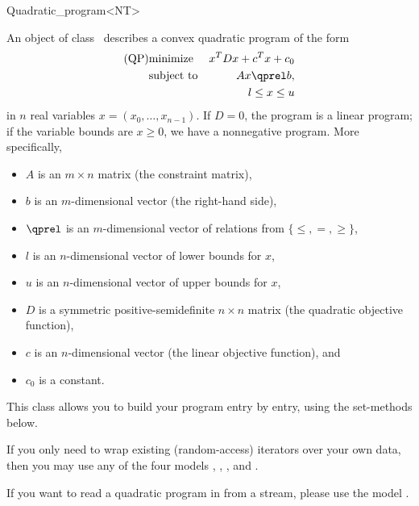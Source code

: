 \begin{ccRefClass}{Quadratic_program<NT>}


\ccDefinition
An object of class \ccRefName\ describes a convex quadratic program of the form
\begin{eqnarray*}
\mbox{(QP)}& \mbox{minimize} & x^{T}Dx+c^{T}x+c_0 \\
&\mbox{subject to}   & Ax\qprel b, \\
&                    & l \leq x \leq u
\end{eqnarray*}
in $n$ real variables $x=(x_0,\ldots,x_{n-1})$. If $D=0$, the program is
a linear program; if the variable bounds are $x\geq 0$, we have a 
nonnegative program. More specifically,  
\begin{itemize}
\item $A$ is an $m\times n$ matrix (the constraint matrix), 
\item $b$ is an $m$-dimensional vector (the right-hand side),
\item $\qprel$ is an $m$-dimensional vector of relations 
from $\{\leq, =, \geq\}$, 
\item $l$ is an $n$-dimensional vector of lower
bounds for $x$,
\item $u$ is an $n$-dimensional vector of upper bounds for
$x$, 
\item $D$ is a symmetric positive-semidefinite $n\times n$ matrix (the
  quadratic objective function),
\item $c$ is an $n$-dimensional vector (the linear objective
  function), and 
\item $c_0$ is a constant.
\end{itemize}

This class allows you to build your program entry by entry, using
the set-methods below. 

If you only need to wrap existing (random-access)
iterators over your own data, then you may use any of the four models
, 
, 
, and
. 

If you want to read a quadratic program in  from a stream, 
please use the model .


\end{ccRefClass}

